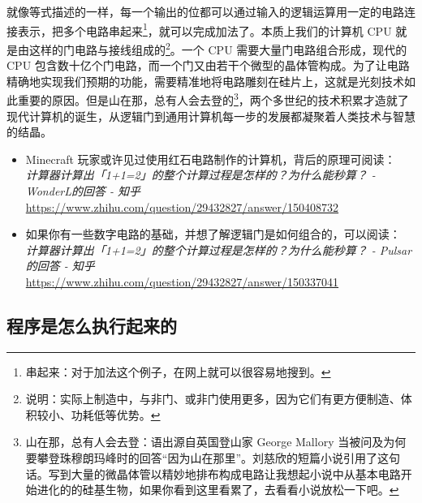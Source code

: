 就像等式描述的一样，每一个输出的位都可以通过输入的逻辑运算用一定的电路连接表示，把多个电路串起来\footnote{串起来：对于加法这个例子，在网上就可以很容易地搜到。}，就可以完成加法了。本质上我们的计算机 CPU 就是由这样的门电路与接线组成的\footnote{说明：实际上制造中，与非门、或非门使用更多，因为它们有更方便制造、体积较小、功耗低等优势。}。一个 CPU 需要大量门电路组合形成，现代的 CPU 包含数十亿个门电路，而一个门又由若干个微型的晶体管构成。为了让电路精确地实现我们预期的功能，需要精准地将电路雕刻在硅片上，这就是光刻技术如此重要的原因。但是山在那，总有人会去登的\footnote{山在那，总有人会去登：语出源自英国登山家 George Mallory 当被问及为何要攀登珠穆朗玛峰时的回答“因为山在那里”。‌刘慈欣的短篇小说引用了这句话。写到大量的微晶体管以精妙地排布构成电路让我想起小说中从基本电路开始进化的的硅基生物，如果你看到这里看累了，去看看小说放松一下吧。}，两个多世纪的技术积累才造就了现代计算机的诞生，从逻辑门到通用计算机每一步的发展都凝聚着人类技术与智慧的结晶。

\begin{tcolorbox}[myrecommendbox, title=推荐阅读, breakable=false]
    \begin{itemize}
        \item Minecraft 玩家或许见过使用红石电路制作的计算机，背后的原理可阅读：\\
              \textit{计算器计算出「1+1=2」的整个计算过程是怎样的？为什么能秒算？ - WonderL的回答 - 知乎}\\
              \url{https://www.zhihu.com/question/29432827/answer/150408732}
        \item 如果你有一些数字电路的基础，并想了解逻辑门是如何组合的，可以阅读：\\
              \textit{计算器计算出「1+1=2」的整个计算过程是怎样的？为什么能秒算？ - Pulsar的回答 - 知乎}\\
              \url{https://www.zhihu.com/question/29432827/answer/150337041}
    \end{itemize}
\end{tcolorbox}

\newpage

\subsection{程序是怎么执行起来的}

